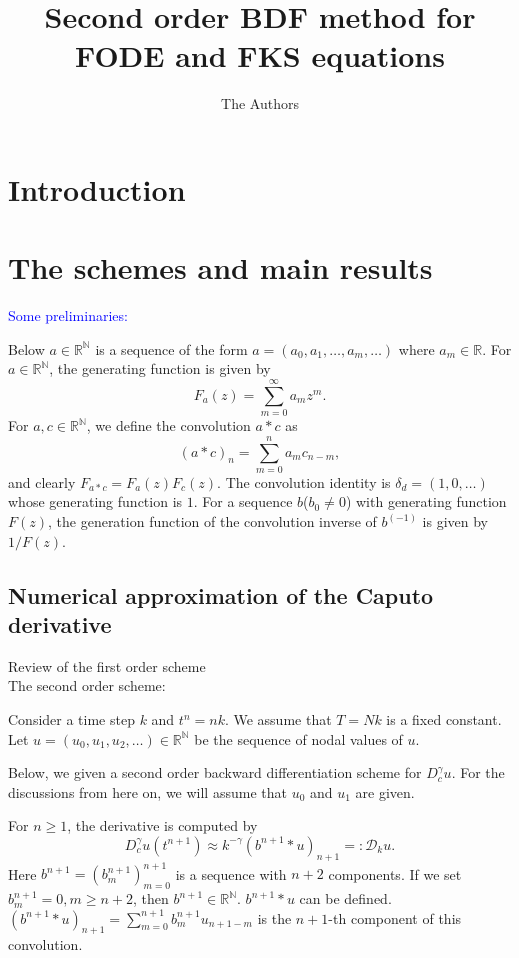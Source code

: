 \documentclass[11pt]{article} %
\title{Second order BDF method for FODE and FKS equations}
\author{The Authors}
\newcommand{\tcb}[1]{\textcolor{blue}{#1}}
\begin{document}
\maketitle

\section{Introduction}

\section{The schemes and main results}

\tcb{Some preliminaries:}


Below $a\in \mathbb{R}^{\mathbb{N}}$ is a sequence of the form $a=(a_0, a_1, \ldots, a_m, \ldots)$ where $a_m\in\mathbb{R}$.
For $a\in\mathbb{R}^{\mathbb{N}}$, the generating function is given by $$
F_a(z)=\sum_{m=0}^{\infty}a_m z^m.
$$
For $a, c\in \mathbb{R}^{\mathbb{N}}$, we define the convolution $a*c$ as $$
(a*c)_n=\sum_{m=0}^{n}a_m c_{n-m},
$$
and clearly $F_{a*c}=F_a(z)F_c(z)$. The convolution identity is $\delta_d=(1,0,\ldots)$ whose generating function is $1$.
For a sequence $b$($b_0\neq 0$) with generating function $F(z)$, the generation function of the convolution inverse of $b^{(-1)}$ is given by $1/F(z)$.

\subsection{Numerical approximation of the Caputo derivative}
Review of the first order scheme
\\
The second order scheme:

Consider a time step $k$ and $t^n=nk$. We assume that $T=Nk$ is a fixed constant. 
Let $u=(u_0, u_1, u_2, \ldots)\in \mathbb{R}^{\mathbb{N}}$ be the sequence of nodal values of $u$.

Below, we given a second order backward differentiation scheme for $D_c^{\gamma}u$. For the discussions from here on, we will assume that $u_0$ and $u_1$ are given. 

For $n\ge 1$, the derivative is computed by $$
D_c^{\gamma}u(t^{n+1})\approx
k^{-\gamma}(b^{n+1}*u)_{n+1}=:\mathcal{D}_k u.
$$
Here $b^{n+1}=(b_m^{n+1})_{m=0}^{n+1}$ is a sequence with $n+2$ components. If we set $b_m^{n+1}=0, m\ge n+2$, then $b^{n+1}\in\mathbb{R}^{\mathbb{N}}$. $b^{n+1}*u$ can be defined. $(b^{n+1}*u)_{n+1}=\sum_{m=0}^{n+1}b_{m}^{n+1}u_{n+1-m}$ is the $n+1$-th component of this convolution.
\end{document}
